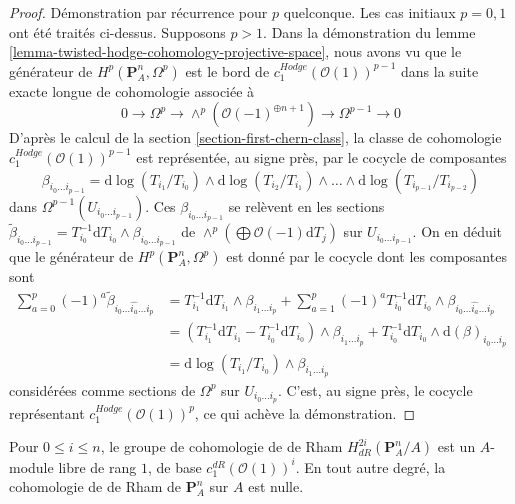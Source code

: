 \begin{proof}
\medskip\noindent
Démonstration par récurrence pour $p$ quelconque. Les cas initiaux $p = 0, 1$ ont été traités
ci-dessus. Supposons $p > 1$. Dans la démonstration du
lemme \ref{lemma-twisted-hodge-cohomology-projective-space},
nous avons vu que le générateur de $H^p(\mathbf{P}^n_A, \Omega^p)$
est le bord de $c_1^{Hodge}(\mathcal{O}(1))^{p - 1}$
dans la suite exacte longue de cohomologie associée à
$$
0 \to \Omega^p \to \wedge^p\left(\mathcal{O}(-1)^{\oplus n + 1}\right)
\to \Omega^{p - 1} \to 0
$$
D'après le calcul de la section \ref{section-first-chern-class},
la classe de cohomologie $c_1^{Hodge}(\mathcal{O}(1))^{p - 1}$
est représentée, au signe près, par le cocycle de composantes
$$
\beta_{i_0 \ldots i_{p - 1}} =
\text{d}\log(T_{i_1}/T_{i_0}) \wedge
\text{d}\log(T_{i_2}/T_{i_1}) \wedge \ldots \wedge
\text{d}\log(T_{i_{p - 1}}/T_{i_{p - 2}})
$$
dans $\Omega^{p - 1}(U_{i_0 \ldots i_{p - 1}})$. Ces
$\beta_{i_0 \ldots i_{p - 1}}$ se relèvent en les sections
$\tilde \beta_{i_0 \ldots i_{p -1}} =
T_{i_0}^{-1}\text{d}T_{i_0} \wedge \beta_{i_0 \ldots i_{p - 1}}$
de $\wedge^p(\bigoplus \mathcal{O}(-1) \text{d}T_j)$ sur
$U_{i_0 \ldots i_{p - 1}}$. On en déduit que le générateur de
$H^p(\mathbf{P}^n_A, \Omega^p)$ est donné par le cocycle dont
les composantes sont
\begin{align*}
\sum\nolimits_{a = 0}^p (-1)^a
\tilde \beta_{i_0 \ldots \hat{i_a} \ldots i_p}
& =
T_{i_1}^{-1}\text{d}T_{i_1} \wedge \beta_{i_1 \ldots i_p}
+ \sum\nolimits_{a = 1}^p (-1)^a
T_{i_0}^{-1}\text{d}T_{i_0} \wedge
\beta_{i_0 \ldots \hat{i_a} \ldots i_p} \\
& =
(T_{i_1}^{-1}\text{d}T_{i_1} - T_{i_0}^{-1}\text{d}T_{i_0}) \wedge
\beta_{i_1 \ldots i_p} +
T_{i_0}^{-1}\text{d}T_{i_0} \wedge \text{d}(\beta)_{i_0 \ldots i_p} \\
& =
\text{d}\log(T_{i_1}/T_{i_0}) \wedge \beta_{i_1 \ldots i_p}
\end{align*}
considérées comme sections de $\Omega^p$ sur $U_{i_0 \ldots i_p}$.
C'est, au signe près, le cocycle représentant
$c_1^{Hodge}(\mathcal{O}(1))^p$, ce qui achève la démonstration.
\end{proof}

\begin{lemma}
\label{lemma-de-rham-cohomology-projective-space}
Pour $0 \leq i \leq n$, le groupe de cohomologie de de Rham
$H^{2i}_{dR}(\mathbf{P}^n_A/A)$ est un $A$-module libre de rang $1$,
de base $c_1^{dR}(\mathcal{O}(1))^i$.
En tout autre degré, la cohomologie de de Rham de $\mathbf{P}^n_A$
sur $A$ est nulle.
\end{lemma}

